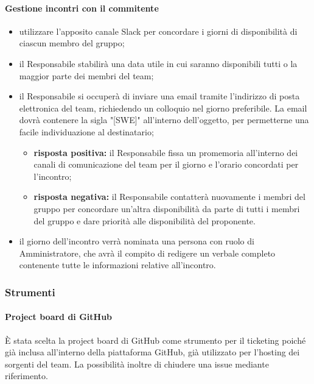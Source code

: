 	\paragraph{Gestione incontri con il commitente}
	\begin{itemize}
		\item utilizzare l'apposito canale Slack per concordare i giorni di disponibilità di ciascun membro del gruppo;
		\item il Responsabile stabilirà una data utile in cui saranno disponibili tutti o la maggior parte dei membri del team;
		\item il Responsabile si occuperà di inviare una email tramite l'indirizzo di posta elettronica del team, richiedendo un colloquio nel giorno preferibile. La email dovrà contenere la sigla "[SWE]" all'interno dell'oggetto, per permetterne una facile individuazione al destinatario;
		\begin{itemize}
			\item \textbf{risposta positiva:} il Responsabile fissa un promemoria all'interno dei canali di comunicazione del team per il giorno e l'orario concordati per l'incontro;
			\item \textbf{risposta negativa:} il Responsabile contatterà nuovamente i membri del gruppo per concordare un'altra disponibilità da parte di tutti i membri del gruppo e dare priorità alle disponibilità del proponente.
		\end{itemize}
		\item il giorno dell'incontro verrà nominata una persona con ruolo di Amministratore, che avrà il compito di redigere un verbale completo contenente tutte le informazioni relative all'incontro.
	\end{itemize}


	\subsubsection{Strumenti}
   	\paragraph{Project board di GitHub}
	È stata scelta la project board di GitHub come strumento per il ticketing poiché già inclusa all'interno della piattaforma GitHub, già utilizzato per l'hosting dei sorgenti del team. La possibilità inoltre di chiudere una issue mediante riferimento.
	

